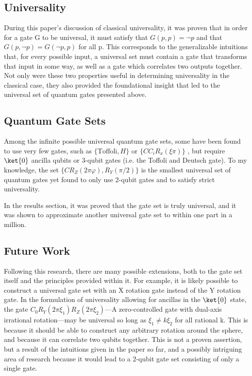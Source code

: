 \documentclass[12pt]{article}
\begin{document}
\subsection{Universality}
During this paper's discussion of classical universality, it was proven that in order for a gate G to be universal, it must satisfy that $G(p, p) = \neg p$ and that $G(p, \neg p) = G(\neg p, p)$ for all p. This corresponds to the generalizable intuitions that, for every possible input, a universal set must contain a gate that transforms that input in some way, as well as a gate which correlates two outputs together. Not only were these two properties useful in determining universality in the classical case, they also provided the foundational insight that led to the universal set of quantum gates presented above.

\subsection{Quantum Gate Sets}
Among the infinite possible universal quantum gate sets, some have been found to use very few gates, such as $\{\text{Toffoli}, H\}$ \cite{Shi2002} or $\{CC_iR_x(\xi\pi)\}$ \cite{Deutsch1995}, but require $\ket{0}$ ancilla qubits or 3-qubit gates (i.e. the Toffoli and Deutsch gate). To my knowledge, the set $\{CR_Z(2\pi\varphi), R_Y(\pi/2)\}$ is the smallest universal set of quantum gates yet found to only use 2-qubit gates and to satisfy strict universality.

In the results section, it was proved that the gate set is truly universal, and it was shown to approximate another universal gate set to within one part in a million.

\subsection{Future Work}
Following this research, there are many possible extensions, both to the gate set itself and the principles provided within it. For example, it is likely possible to construct a universal gate set with an X rotation gate instead of the Y rotation gate. In the formulation of universality allowing for ancillas in the $\ket{0}$ state, the gate $C_0R_Y(2\pi\xi_1)R_Z(2\pi\xi_2)$---A zero-controlled gate with dual-axis irrational rotation---may be universal so long as $\xi_1 \ne k \xi_2$ for all rational k. This is because it should be able to construct any arbitrary rotation around the sphere, and because it can correlate two qubits together. This is not a proven assertion, but a result of the intuitions given in the paper so far, and a possibly intriguing area of research because it would lead to a 2-qubit gate set consisting of only a single gate.

\pagebreak
\nocite{Barenco1995, Nielsen2023}
\printbibliography
\end{document}
